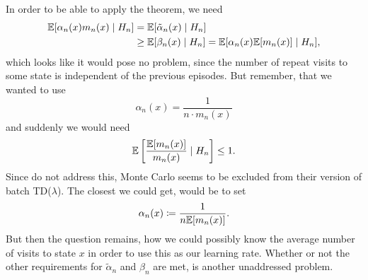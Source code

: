 In order to be able to apply the theorem, we need
\begin{align*}
    \mathbb{E}[\alpha_n(x)m_n(x)\mid H_n]
    &=\mathbb{E}[\tilde{\alpha}_n(x)\mid H_n]\\
    &\ge \mathbb{E}[\beta_n(x)\mid H_n] 
    =\mathbb{E}[\alpha_n(x)\mathbb{E}[m_n(x)]\mid H_n],
\end{align*}
which looks like it would pose no problem, since the number of repeat visits to some state is independent of the previous episodes. But remember, that we wanted to use 
\[
    \alpha_n(x)=\frac{1}{n\cdot m_n(x)}
\]
and suddenly we would need
\[
    \mathbb{E}\left[\frac{\mathbb{E}[m_n(x)]}{m_n(x)}\mid H_n\right]\le 1.
\]
Since \textcite{jaakkolaConvergenceStochasticIterative1994a} do not address this, Monte Carlo seems to be excluded from their version of batch TD(\(\lambda\)). The closest we could get, would be to set
\[
    \alpha_n(x)\coloneqq \frac{1}{n \mathbb{E}[m_n(x)]}.
\]
But then the question remains, how we could possibly know the average number of visits to state \(x\) in order to use this as our learning rate. Whether or not the other requirements for \(\tilde{\alpha}_n\) and \(\beta_n\) are met, is another unaddressed problem. 

